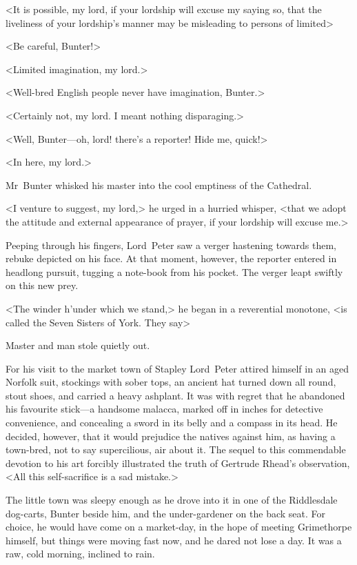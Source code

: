 <It is possible, my lord, if your lordship will excuse my saying so, that the liveliness of your lordship's manner may be misleading to persons of limited\longdash>

<Be careful, Bunter!>

<Limited imagination, my lord.>

<Well-bred English people never have imagination, Bunter.>

<Certainly not, my lord. I meant nothing disparaging.>

<Well, Bunter—oh, lord! there's a reporter! Hide me, quick!>

<In here, my lord.>

Mr~Bunter whisked his master into the cool emptiness of the Cathedral.

<I venture to suggest, my lord,> he urged in a hurried whisper, <that we adopt the attitude and external appearance of prayer, if your lordship will excuse me.>

Peeping through his fingers, Lord~Peter saw a verger hastening towards them, rebuke depicted on his face. At that moment, however, the reporter entered in headlong pursuit, tugging a note-book from his pocket. The verger leapt swiftly on this new prey.

<The winder h'under which we stand,> he began in a reverential monotone, <is called the Seven Sisters of York. They say\longdash>

Master and man stole quietly out.

For his visit to the market town of Stapley Lord~Peter attired himself in an aged Norfolk suit, stockings with sober tops, an ancient hat turned down all round, stout shoes, and carried a heavy ashplant. It was with regret that he abandoned his favourite stick—a handsome malacca, marked off in inches for detective convenience, and concealing a sword in its belly and a compass in its head. He decided, however, that it would prejudice the natives against him, as having a town-bred, not to say supercilious, air about it. The sequel to this commendable devotion to his art forcibly illustrated the truth of Gertrude Rhead's observation, <All this self-sacrifice is a sad mistake.>

The little town was sleepy enough as he drove into it in one of the Riddlesdale dog-carts, Bunter beside him, and the under-gardener on the back seat. For choice, he would have come on a market-day, in the hope of meeting Grimethorpe himself, but things were moving fast now, and he dared not lose a day. It was a raw, cold morning, inclined to rain.

